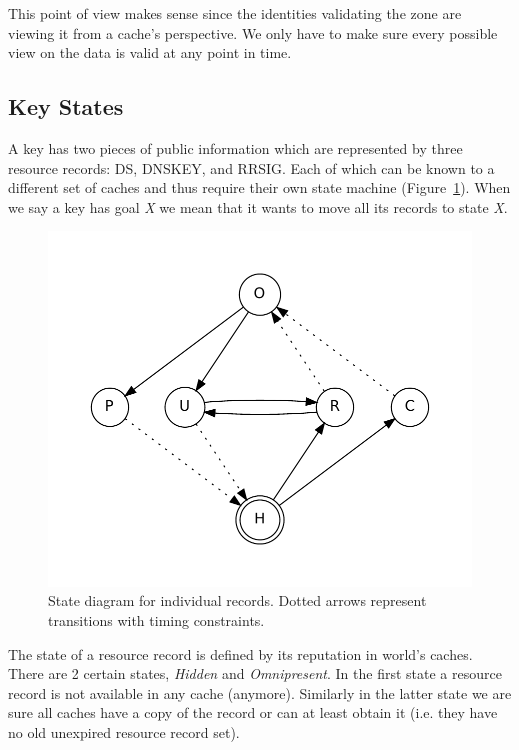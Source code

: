 \documentclass[twoside,english, a4paper]{article}
\begin{document}
This point of view makes sense since the identities validating the 
zone are viewing it from a cache's perspective. We only have to make 
sure every
possible view on the data is valid at any point in time.

\subsection{Key States} \label{sec:keystates}

A key has two pieces of public information which are 
represented by three resource records: DS, DNSKEY, and RRSIG. Each of 
which can be known to a different set of caches and thus require their
own state machine (Figure~\ref{fig:states}). When we say a key has 
goal \emph{X} we mean that it wants to move all its records to state
\emph{X}.

\begin{figure}[h]
	\centering
	\includegraphics[scale=0.5]{states.pdf}
	\caption{State diagram for individual records. Dotted arrows 
				represent transitions with timing constraints.}
	\label{fig:states}
\end{figure}

The state of a resource record is defined by its reputation in 
world's caches. There are 2 certain states, \emph{Hidden} and \emph
{Omnipresent}. In the first state a resource record is not available 
in any cache (anymore). Similarly in the latter state we are sure 
all caches have a copy of the record or can at least obtain it (i.e. 
they have no old unexpired resource record set).
\end{document}
